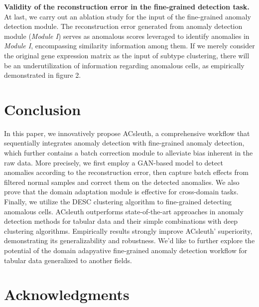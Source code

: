 \documentclass{article}
\begin{document}
\textbf{Validity of the reconstruction error in the fine-grained detection task.}	At last, we carry out an 
ablation study for the input of the fine-grained anomaly detection module. The 
reconstruction error generated from anomaly detection module (\textit{Module I}) serves as 
anomalous scores leveraged to identify anomalies in \textit{Module I}, encompassing similarity 
information among them. If we merely consider the original gene expression matrix as the 
input of subtype clustering, there will be an underutilization of information regarding 
anomalous cells, as empirically demonstrated in figure 2.
\section{Conclusion}
In this paper, we innovatively propose ACsleuth, a comprehensive workflow that sequentially 
integrates anomaly detection with fine-grained anomaly detection, which further contains a batch 
correction module to alleviate bias inherent in the raw data. More precisely, we first 
employ a GAN-based model to detect anomalies according to the reconstruction error, then 
capture batch effects from filtered normal samples and correct them on the detected 
anomalies. We also prove that the domain adaptation module is effective for cross-domain tasks. 
Finally, we utilize the DESC clustering algorithm to fine-grained detecting anomalous cells. 
ACsleuth outperforms state-of-the-art approaches in anomaly detection methods for tabular 
data and their simple combinations with deep clustering algorithms. Empirically results 
strongly improve ACsleuth’ superiority, demonstrating its generalizability and robustness. 
We’d like to further explore the potential of the domain adapyative fine-grained anomaly 
detection workflow for tabular data generalized to another fields.
\section*{Acknowledgments}






\end{document}
